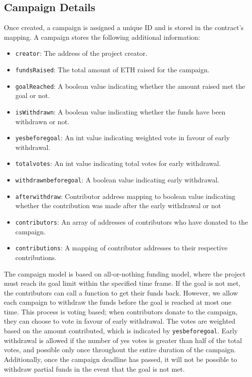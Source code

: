 \documentclass[12pt,reqno]{article}
\begin{document}
\subsection{Campaign Details}
Once created, a campaign is assigned a unique ID and is stored in the contract's mapping. 
A campaign stores the following additional information: \\ 
\begin{itemize}
    \item \texttt{creator}: The address of the project creator.
    \item \texttt{fundsRaised}: The total amount of ETH raised for the campaign.
    \item \texttt{goalReached}: A boolean value indicating whether the amount raised met the goal or not.
    \item \texttt{isWithdrawn}: A boolean value indicating whether the funds have been withdrawn or not.
    \item \texttt{yesbeforegoal}: An int value indicating weighted vote in favour of early withdrawal.
    \item \texttt{totalvotes}: An int value indicating total votes for early withdrawal.
    \item \texttt{withdrawnbeforegoal}: A boolean value indicating early withdrawal.
    \item \texttt{afterwithdraw}: Contributor address mapping to boolean value indicating whether the 
    contribution was made after the early withdrawal or not 
    \item \texttt{contributors}: An array of addresses of contributors who have donated to the campaign.
    \item \texttt{contributions}: A mapping of contributor addresses to their respective contributions.
\end{itemize}
The campaign model is based on all-or-nothing funding model, where the project must reach its goal 
limit within the specified time frame. If the goal is not met, the contributors can call a function 
to get their funds back. However, we allow each campaign to withdraw the funds before the goal is 
reached at most one time. This process is voting based; when contributors donate to the campaign, 
they can choose to vote in favour of early withdrawal. The votes are weighted based on the amount 
contributed, which is indicated by \texttt{yesbeforegoal}. Early withdrawal is allowed if the number of 
yes votes is greater than half of the total votes, and possible only once throughout the entire duration 
of the campaign. Additionally, once the campaign deadline has passed, it will not be possible to 
withdraw partial funds in the event that the goal is not met. \\ 
\end{document}
